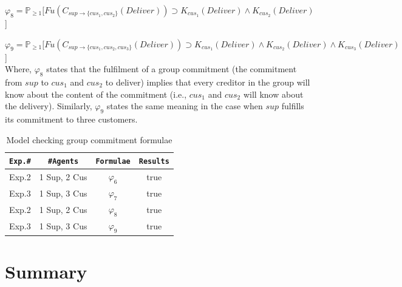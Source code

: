 \noindent $\varphi_8 = \mathbb{P}_{\geq1}[Fu (C_{sup \to \{cus_1,cus_2\}} (Deliver)) \supset K_{cus_1} (Deliver) \wedge  K_{cus_2} (Deliver)$]

\noindent $\varphi_9 = \mathbb{P}_{\geq1}[Fu (C_{sup \to \{cus_1,cus_2,cus_3\}} (Deliver)) \supset K_{cus_1} (Deliver) \wedge  K_{cus_2} (Deliver) \wedge  K_{cus_3} (Deliver)$]\\

Where, $\varphi_8$ states that the fulfilment of a group commitment (the commitment from $sup$ to $cus_1$ and $cus_2$ to deliver) implies that every creditor in the group will know about the content of the commitment (i.e., $cus_1$ and $cus_2$ will know about the delivery). Similarly, $\varphi_9$ states the same meaning in the case when $sup$ fulfills its commitment to three customers.

\begin{table}[htp]
\centering \caption{Model checking group commitment formulae} \label{formulae-prism-group-comm-cha5}
\begin{tabular}{|c|c|c|c|}
\hline
\texttt{Exp.\#}  &\texttt{\#Agents}  &\texttt{Formulae} &\texttt{Results} \\
\hline\hline
Exp.2            & 1 Sup, 2 Cus      &$\varphi_6$           &true  \\
\hline
Exp.3            & 1 Sup, 3 Cus      &$\varphi_7$           &true  \\
\hline
Exp.2            & 1 Sup, 2 Cus      &$\varphi_8$           &true  \\
\hline
Exp.3            & 1 Sup, 3 Cus      &$\varphi_9$           &true  \\
\hline

\end{tabular}
\end{table}


\section{Summary}\label{sec:conclusion}

